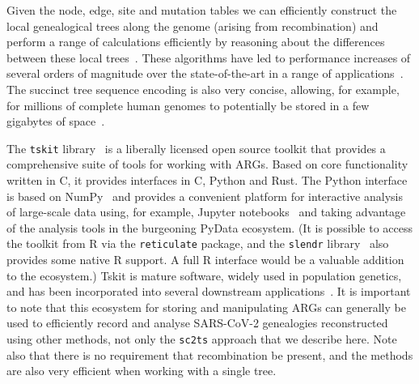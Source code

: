 \documentclass{article}
\begin{document}
Given the node, edge, site and mutation tables we can
efficiently construct the local
genealogical trees along the genome (arising from recombination)
and perform a range of calculations efficiently by
reasoning about the differences between these local
trees~\citep{Kelleher2016-wk,Ralph2020-efficiently}. These
algorithms have led to performance increases of several orders
of magnitude over the state-of-the-art in a range of
applications~\citep{Kelleher2016-wk,Kelleher2018-xc,Kelleher2019-ba,
Ralph2020-efficiently,Baumdicker2022-ep}.
The succinct tree sequence encoding
is also very concise, allowing, for example, for millions of
complete human genomes to potentially be stored in a few gigabytes of
space~\citep{Kelleher2019-ba}.

The \texttt{tskit} library~\citep{Tskit2023-tskit} is a liberally
licensed open source toolkit that provides a comprehensive suite
of tools for working with ARGs. Based on core functionality written
in C, it provides interfaces in C, Python and Rust. The Python interface
is based on NumPy~\citep{Harris2020-array} and provides a convenient
platform for interactive analysis of large-scale data using, for
example, Jupyter notebooks~\citep{Kluyver2016-jupyter} and taking
advantage of the analysis tools in the burgeoning PyData ecosystem.
(It is possible to access the toolkit from R via the \texttt{reticulate}
package, and the \texttt{slendr} library~\citep{Petr2022-slendr}
also provides some native R support. A full R interface would be a
valuable addition to the ecosystem.)
Tskit is mature software, widely used in population genetics, and
has been incorporated into several downstream
applications~\citep[e.g.,][]{Haller2019-slim,Speidel2019-yh,
Terasaki2021-geonomics,
Fan2022-genealogical,Korfmann2022-weak,
Mahmoudi2022-bayesian,Petr2022-slendr,Rasmussen2022-espalier,
Zhang2023-lf}.
It is important to note that
this ecosystem for storing and manipulating ARGs can
generally be used to efficiently record and analyse SARS-CoV-2 genealogies reconstructed
using other methods, not only the \texttt{sc2ts} approach that we describe here.
Note also that there is no requirement that recombination be present,
and the methods are also very efficient when working with a single tree.
\end{document}
